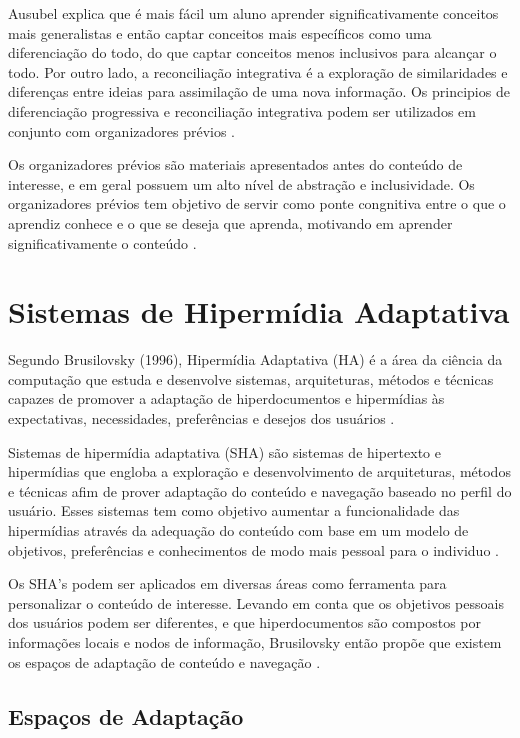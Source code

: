 Ausubel explica que é mais fácil um aluno aprender significativamente conceitos mais generalistas e então captar conceitos mais específicos como uma diferenciação do todo, do que captar conceitos menos inclusivos para alcançar o todo. Por outro lado, a reconciliação integrativa é a exploração  de similaridades e diferenças entre ideias para assimilação de uma nova informação. Os principios de diferenciação progressiva e reconciliação integrativa podem ser utilizados em conjunto com organizadores prévios \cite{fragelli2010}.

Os organizadores prévios são materiais apresentados antes do conteúdo de interesse, e em geral possuem um alto nível de abstração e inclusividade. Os organizadores prévios tem objetivo de servir como ponte congnitiva entre o que o aprendiz conhece e o que se deseja que aprenda, motivando em aprender significativamente o conteúdo \cite{ausubel2000, tavares2010}.

\section{Sistemas de Hipermídia Adaptativa}

Segundo Brusilovsky (1996), Hipermídia Adaptativa (HA) é a área da ciência da computação que estuda e desenvolve sistemas, arquiteturas, métodos e técnicas capazes de promover a adaptação de hiperdocumentos e hipermídias às expectativas, necessidades, preferências e desejos dos usuários \cite{diniz2012}.

Sistemas de hipermídia adaptativa (SHA) são sistemas de hipertexto e hipermídias que engloba a exploração e desenvolvimento de arquiteturas, métodos e técnicas afim de prover adaptação do conteúdo e navegação baseado no perfil do usuário. Esses sistemas tem como objetivo aumentar a funcionalidade das hipermídias através da adequação do conteúdo com base em um modelo de objetivos, preferências e conhecimentos de modo mais pessoal para o individuo \cite{brusilovsky1996, fragelli2010}.

Os SHA's podem ser aplicados em diversas áreas como ferramenta para personalizar o conteúdo de interesse. Levando em conta que os objetivos pessoais dos usuários podem ser diferentes, e que hiperdocumentos são compostos por informações locais e nodos de informação, Brusilovsky então propõe que  existem os espaços de adaptação de conteúdo e navegação \cite{brusilovsky1996}.

\subsection{Espaços de Adaptação}

